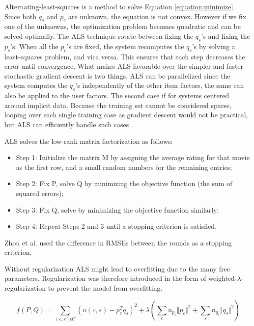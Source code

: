 Alternating-least-squares is a method to solve Equation \ref{equation:minimize}. Since both $q_{s}$ and $p_{c}$ are unknown, the equation is not convex. However if we fix one of the unknowns, the optimization problem becomes quadratic and can be solved optimally. The ALS technique rotate between fixing the $q_{s}$'s and fixing the $p_{c}$'s. When all the $p_{c}$'s are fixed, the system recomputes the $q_{s}$'s by solving a least-squares problem, and vica versa. This ensures that each step decreases the error until convergence. What makes ALS favorable over the simpler and faster stochastic gradient descent is two things. ALS can be parallelized since the system computes the $q_{s}$'s independently of the other item factors, the same can also be applied to the user factors. The second case if for systems centered around implicit data. Because the training set cannot be considered sparse, looping over each single training case as gradient descent would not be practical, but ALS can efficiently handle such cases \cite{Hu2008}.

ALS solves the low-rank matrix factorization as follows:

\begin{itemize}
\item Step 1: Initialize the matrix M by assigning the average rating for that movie as the first row, and a small random numbers for the remaining entries;
\item Step 2: Fix P, solve Q by minimizing the objective function (the sum of squared errors);
\item Step 3: Fix Q, solve by minimizing the objective function similarly;
\item Step 4: Repeat Steps 2 and 3 until a stopping criterion is satisfied.
\end{itemize}

Zhou et al. \cite{Zhou2008} used the difference in RMSEs between the rounds as a stopping criterion.

Without regularization ALS might lead to overfitting due to the many free parameters. Regularization was therefore introduced in the form of weighted-$\lambda$-regularization to prevent the model from overfitting.

\begin{equation}
f(P, Q) = \sum_{(c,s)\epsilon C} (u(c,s) - p^{T}_{c}q_{s})^{2} + \lambda (\sum_{c} n_{p_{c}} \Vert p_{c} \Vert ^{2} + \sum_{s} n_{q_{s}} \Vert q_{s} \Vert ^{2})
\label{WeightedLamba}
\end{equation}

